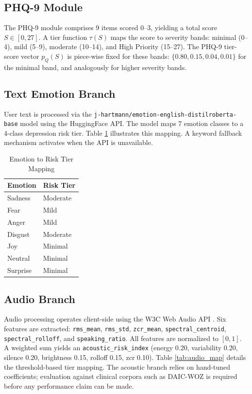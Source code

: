 \documentclass[conference]{IEEEtran}
\begin{document}
\subsection{PHQ-9 Module}
The PHQ-9 module comprises 9 items scored 0--3, yielding a total score $S \in [0, 27]$. A tier function $\tau(S)$ maps the score to severity bands: minimal (0--4), mild (5--9), moderate (10--14), and High Priority (15--27). The PHQ-9 tier-score vector $p_Q(S)$ is piece-wise fixed for these bands: $\{0.80, 0.15, 0.04, 0.01\}$ for the minimal band, and analogously for higher severity bands.

\subsection{Text Emotion Branch}
User text is processed via the \texttt{j-hartmann/emotion-english-distilroberta-base} model \cite{hartmann_model} using the HuggingFace API. The model maps 7 emotion classes to a 4-class depression risk tier. Table \ref{tab:emotion_map} illustrates this mapping. A keyword fallback mechanism activates when the API is unavailable.

\begin{table}[htbp]
\caption{Emotion to Risk Tier Mapping}
\label{tab:emotion_map}
\centering
\begin{tabular}{ll}
\toprule
\textbf{Emotion} & \textbf{Risk Tier} \\
\midrule
Sadness & Moderate \\
Fear & Mild \\
Anger & Mild \\
Disgust & Moderate \\
Joy & Minimal \\
Neutral & Minimal \\
Surprise & Minimal \\
\bottomrule
\end{tabular}
\end{table}

\subsection{Audio Branch}
Audio processing operates client-side using the W3C Web Audio API \cite{w3c_webaudio}. Six features are extracted: \texttt{rms\_mean}, \texttt{rms\_std}, \texttt{zcr\_mean}, \texttt{spectral\_centroid}, \texttt{spectral\_rolloff}, and \texttt{speaking\_ratio}. All features are normalized to $[0, 1]$. A weighted sum yields an \texttt{acoustic\_risk\_index} (energy 0.20, variability 0.20, silence 0.20, brightness 0.15, rolloff 0.15, zcr 0.10). Table \ref{tab:audio_map} details the threshold-based tier mapping. The acoustic branch relies on hand-tuned coefficients; evaluation against clinical corpora such as DAIC-WOZ \cite{gratch_daic} is required before any performance claim can be made.
\end{document}
